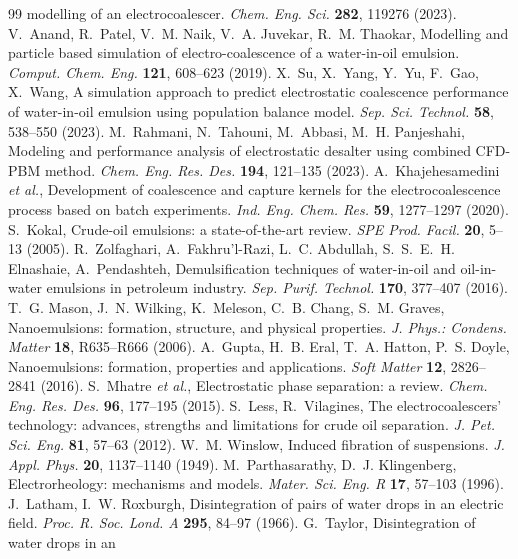 \documentclass[aps,prfluids,reprint,amsmath,amssymb,superscriptaddress,longbibliography]{revtex4-2}
\begin{document}
\begin{thebibliography}{99}
modelling of an electrocoalescer. \emph{Chem. Eng. Sci.} \textbf{282},
119276 (2023).
 V.~Anand, R.~Patel, V.~M. Naik, V.~A. Juvekar,
R.~M. Thaokar, Modelling and particle based simulation of
electro-coalescence of a water-in-oil emulsion. \emph{Comput. Chem. Eng.}
\textbf{121}, 608--623 (2019).
 X.~Su, X.~Yang, Y.~Yu, F.~Gao, X.~Wang, A simulation
approach to predict electrostatic coalescence performance of water-in-oil
emulsion using population balance model. \emph{Sep. Sci. Technol.}
\textbf{58}, 538--550 (2023).
 M.~Rahmani, N.~Tahouni, M.~Abbasi,
M.~H. Panjeshahi, Modeling and performance analysis of electrostatic
desalter using combined CFD-PBM method. \emph{Chem. Eng. Res. Des.}
\textbf{194}, 121--135 (2023).
 A.~Khajehesamedini \emph{et al.}, Development of
coalescence and capture kernels for the electrocoalescence process based on
batch experiments. \emph{Ind. Eng. Chem. Res.} \textbf{59}, 1277--1297
(2020).
 S.~Kokal, Crude-oil emulsions: a state-of-the-art
review. \emph{SPE Prod. Facil.} \textbf{20}, 5--13 (2005).
 R.~Zolfaghari, A.~Fakhru'l-Razi, L.~C. Abdullah,
S.~S.~E.~H. Elnashaie, A.~Pendashteh, Demulsification techniques of
water-in-oil and oil-in-water emulsions in petroleum industry.
\emph{Sep. Purif. Technol.} \textbf{170}, 377--407 (2016).
 T.~G. Mason, J.~N. Wilking, K.~Meleson, C.~B. Chang,
S.~M. Graves, Nanoemulsions: formation, structure, and physical properties.
\emph{J. Phys.: Condens. Matter} \textbf{18}, R635--R666 (2006).
 A.~Gupta, H.~B. Eral, T.~A. Hatton, P.~S. Doyle,
Nanoemulsions: formation, properties and applications. \emph{Soft Matter}
\textbf{12}, 2826--2841 (2016).
 S.~Mhatre \emph{et al.}, Electrostatic phase
separation: a review. \emph{Chem. Eng. Res. Des.} \textbf{96}, 177--195
(2015).
 S.~Less, R.~Vilagines, The electrocoalescers'
technology: advances, strengths and limitations for crude oil separation.
\emph{J. Pet. Sci. Eng.} \textbf{81}, 57--63 (2012).
 W.~M. Winslow, Induced fibration of suspensions.
\emph{J. Appl. Phys.} \textbf{20}, 1137--1140 (1949).
 M.~Parthasarathy, D.~J. Klingenberg,
Electrorheology: mechanisms and models. \emph{Mater. Sci. Eng. R}
\textbf{17}, 57--103 (1996).
 J.~Latham, I.~W. Roxburgh, Disintegration of
pairs of water drops in an electric field. \emph{Proc. R. Soc. Lond. A}
\textbf{295}, 84--97 (1966).
 G.~Taylor, Disintegration of water drops in an

\end{thebibliography}
\end{document}
